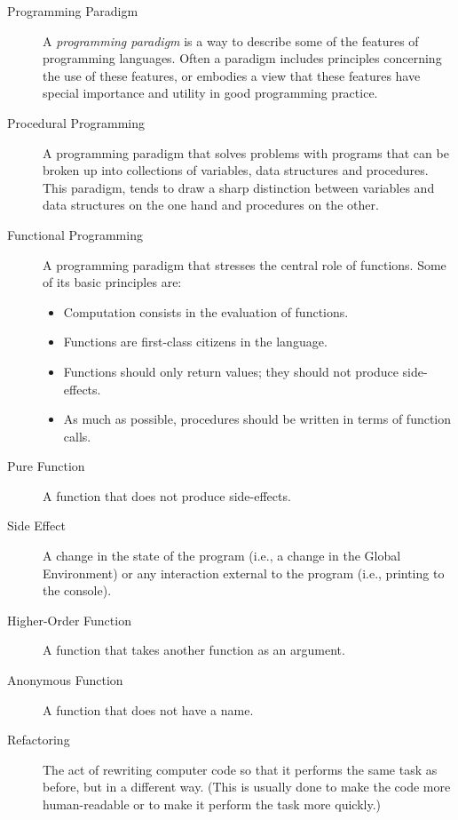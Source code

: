 \documentclass[]{book}
\providecommand{\tightlist}{%
  \setlength{\itemsep}{0pt}\setlength{\parskip}{0pt}}
\theoremstyle{definition}
\theoremstyle{definition}
\theoremstyle{definition}
\theoremstyle{remark}
\begin{document}
{\begin{description}
\item[Programming Paradigm ]
A \emph{programming paradigm} is a way to describe some of the features
of programming languages. Often a paradigm includes principles
concerning the use of these features, or embodies a view that these
features have special importance and utility in good programming
practice.
\item[Procedural Programming ]
A programming paradigm that solves problems with programs that can be
broken up into collections of variables, data structures and procedures.
This paradigm, tends to draw a sharp distinction between variables and
data structures on the one hand and procedures on the other.
\item[Functional Programming ]
A programming paradigm that stresses the central role of functions. Some
of its basic principles are:

\begin{itemize}
\tightlist
\item
  Computation consists in the evaluation of functions.
\item
  Functions are first-class citizens in the language.
\item
  Functions should only return values; they should not produce
  side-effects.
\item
  As much as possible, procedures should be written in terms of function
  calls.
\end{itemize}
\item[Pure Function ]
A function that does not produce side-effects.
\item[Side Effect ]
A change in the state of the program (i.e., a change in the Global
Environment) or any interaction external to the program (i.e., printing
to the console).
\item[Higher-Order Function ]
A function that takes another function as an argument.
\item[Anonymous Function ]
A function that does not have a name.
\item[Refactoring ]
The act of rewriting computer code so that it performs the same task as
before, but in a different way. (This is usually done to make the code
more human-readable or to make it perform the task more quickly.)
\end{description}

}
\end{document}
